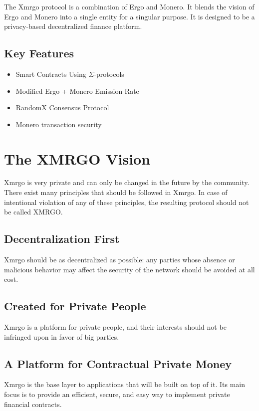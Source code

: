 \documentclass{article}
\begin{document}
\indent The Xmrgo protocol is a combination of Ergo and Monero. It blends the 
vision of Ergo and Monero into a single entity for a singular purpose. It is 
designed to be a privacy-based decentralized finance platform.

\subsection*{Key Features}
\begin{itemize}
    \item Smart Contracts Using $\Sigma$-protocols
    \item Modified Ergo + Monero Emission Rate
    \item RandomX Consensus Protocol
    \item Monero transaction security
\end{itemize}

\section*{The XMRGO Vision}

\indent Xmrgo is very private and can only be changed in the future by the 
community. There exist many principles that should be followed in Xmrgo. 
In case of intentional violation of any of these principles, the resulting 
protocol should not be called XMRGO.

\subsection*{Decentralization First}

\indent Xmrgo should be as decentralized as possible: any parties whose 
absence or malicious behavior may affect the security of the network should 
be avoided at all cost.

\subsection*{Created for Private People}

\indent Xmrgo is a platform for private people, and their interests should 
not be infringed upon in favor of big parties.

\subsection*{A Platform for Contractual Private Money}

\indent Xmrgo is the base layer to applications that will be built on top of 
it. Its main focus is to provide an efficient, secure, and easy way to 
implement private financial contracts.
\end{document}
